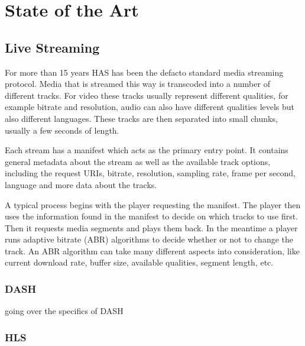 \chapter{State of the Art\label{cha:chapter2}}

\section{Live Streaming\label{sec:live}}

For more than 15 years HAS has been the defacto standard media streaming protocol. Media that is streamed this way is transcoded into a number of different tracks. For video these tracks usually represent different qualities, for example bitrate and resolution, audio can also have different qualities levels but also different languages. These tracks are then separated into small chunks, usually a few seconds of length.

Each stream has a manifest which acts as the primary entry point. It contains general metadata about the stream as well as the available track options, including the request URIs, bitrate, resolution, sampling rate, frame per second, language and more data about the tracks.

A typical process begins with the player requesting the manifest. The player then uses the information found in the manifest to decide on which tracks to use first. Then it requests media segments and plays them back. In the meantime a player runs adaptive bitrate (ABR) algorithms to decide whether or not to change the track. An ABR algorithm can take many different aspects into consideration, like current download rate, buffer size, available qualities, segment length, etc. 



\subsection{DASH\label{sub:dash}}

going over the specifics of DASH

\subsection{HLS\label{sub:hls}}

